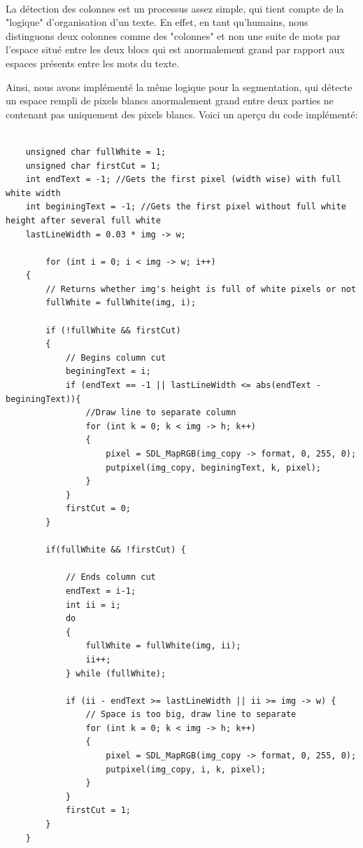 \documentclass{article}
\begin{document}
    \paragraph{}
    La détection des colonnes est un processus assez simple, qui tient compte de la "logique" d'organisation d'un texte. En effet, en tant qu'humains, nous distinguons deux colonnes comme des "colonnes" et non une suite de mots par l'espace situé entre les deux blocs qui est anormalement grand par rapport aux espaces présents entre les mots du texte.
    \par
    Ainsi, nous avons implémenté la même logique pour la segmentation, qui détecte un espace rempli de pixels blancs anormalement grand entre deux parties ne contenant pas uniquement des pixels blancs. Voici un aperçu du code implémenté:
    
    \begin{lstlisting}
    
    unsigned char fullWhite = 1;
    unsigned char firstCut = 1;
    int endText = -1; //Gets the first pixel (width wise) with full white width
    int beginingText = -1; //Gets the first pixel without full white height after several full white 
    lastLineWidth = 0.03 * img -> w;
    
		for (int i = 0; i < img -> w; i++) 
    {
        // Returns whether img's height is full of white pixels or not
        fullWhite = fullWhite(img, i);

        if (!fullWhite && firstCut)
        {   
            // Begins column cut
            beginingText = i;
            if (endText == -1 || lastLineWidth <= abs(endText - beginingText)){
                //Draw line to separate column
                for (int k = 0; k < img -> h; k++)
                {
                    pixel = SDL_MapRGB(img_copy -> format, 0, 255, 0);
                    putpixel(img_copy, beginingText, k, pixel);
                }   
            }
            firstCut = 0;
        }
        
        if(fullWhite && !firstCut) {
        
            // Ends column cut
            endText = i-1;
            int ii = i;
            do
            {
                fullWhite = fullWhite(img, ii);
                ii++;
            } while (fullWhite);
            
            if (ii - endText >= lastLineWidth || ii >= img -> w) {
                // Space is too big, draw line to separate
                for (int k = 0; k < img -> h; k++)
                {
                    pixel = SDL_MapRGB(img_copy -> format, 0, 255, 0);
                    putpixel(img_copy, i, k, pixel);
                }
            }
            firstCut = 1;
        }
    }	
	\end{lstlisting}
\end{document}
